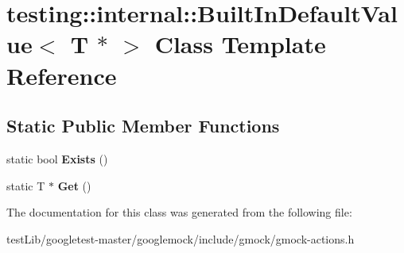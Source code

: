 \hypertarget{classtesting_1_1internal_1_1BuiltInDefaultValue_3_01T_01_5_01_4}{}\section{testing\+:\+:internal\+:\+:Built\+In\+Default\+Value$<$ T $\ast$ $>$ Class Template Reference}
\label{classtesting_1_1internal_1_1BuiltInDefaultValue_3_01T_01_5_01_4}
\subsection*{Static Public Member Functions}
\begin{DoxyCompactItemize}
\item 
\mbox{\label{classtesting_1_1internal_1_1BuiltInDefaultValue_3_01T_01_5_01_4_aafa7172f63d068305fb37d5db40bb543}} 
static bool {\bfseries Exists} ()
\item 
\mbox{\label{classtesting_1_1internal_1_1BuiltInDefaultValue_3_01T_01_5_01_4_adc2fa2bdae767589d171ae3a117e3a9f}} 
static T $\ast$ {\bfseries Get} ()
\end{DoxyCompactItemize}


The documentation for this class was generated from the following file\+:\begin{DoxyCompactItemize}
\item 
test\+Lib/googletest-\/master/googlemock/include/gmock/gmock-\/actions.\+h\end{DoxyCompactItemize}
